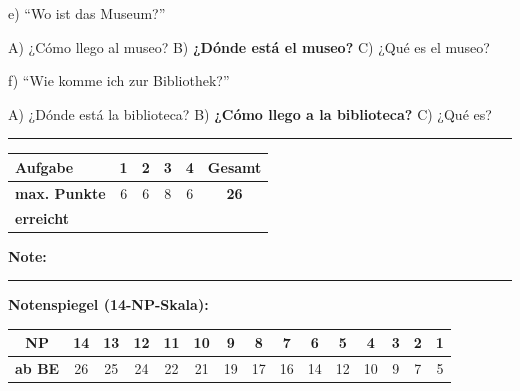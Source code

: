 \documentclass[11pt, a4paper]{article}
\newcommand{\luecke}[1]{\rule{#1}{0.4pt}}
\begin{document}
\noindent
e) ``Wo ist das Museum?''

\hspace{1cm} A) ¿Cómo llego al museo? \quad B) \textbf{¿Dónde está el museo?} \quad C) ¿Qué es el museo?

\vspace{0.8em}

\noindent
f) ``Wie komme ich zur Bibliothek?''

\hspace{1cm} A) ¿Dónde está la biblioteca? \quad B) \textbf{¿Cómo llego a la biblioteca?} \quad C) ¿Qué es?


\vspace{25pt}
\hrule
\vspace{10pt}

\noindent
\begin{tabularx}{\textwidth}{|X|c|c|c|c||c|}
\hline
\textbf{Aufgabe} & 1 & 2 & 3 & 4 & \textbf{Gesamt} \\
\hline
\textbf{max. Punkte} & 6 & 6 & 8 & 6 & \textbf{26} \\
\hline
\textbf{erreicht} & & & & & \\[0.8em]
\hline
\end{tabularx}

\vspace{10pt}

\begin{flushright}
\textbf{Note:} \luecke{2cm}
\end{flushright}

\vspace{1em}

\textbf{Notenspiegel (14-NP-Skala):}

\begin{center}
\footnotesize
\begin{tabular}{|c|c|c|c|c|c|c|c|c|c|c|c|c|c|c|}
\hline
\textbf{NP} & 14 & 13 & 12 & 11 & 10 & 9 & 8 & 7 & 6 & 5 & 4 & 3 & 2 & 1 \\
\hline
\textbf{ab BE} & 26 & 25 & 24 & 22 & 21 & 19 & 17 & 16 & 14 & 12 & 10 & 9 & 7 & 5 \\
\hline
\end{tabular}
\end{center}
\end{document}
